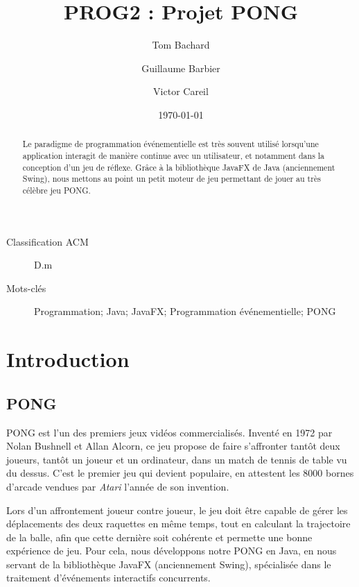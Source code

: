 \documentclass[a4paper,10pt]{article}
\theoremstyle{definition}
\begin{document}
%
\title{PROG2 : Projet PONG}
%
\author{Tom Bachard\and Guillaume Barbier\and Victor Careil}
%
\date{\today}
%
\maketitle
%
%

\begin{description}
  \item[Classification ACM] D.m
  \item[Mots-clés] Programmation; Java; JavaFX; Programmation événementielle; PONG
\end{description}

%
\begin{abstract}
Le paradigme de programmation événementielle est très souvent utilisé lorsqu'une application interagit de manière continue avec un utilisateur, et notamment dans la conception d'un jeu de réflexe. Grâce à la bibliothèque JavaFX de Java (anciennement Swing), nous mettons au point un petit moteur de jeu permettant de jouer au très célèbre jeu PONG.
\end{abstract}
%

%
\section{Introduction}
%

  \subsection{PONG}
	PONG est l'un des premiers jeux vidéos commercialisés. Inventé en 1972 par Nolan Bushnell et Allan Alcorn, ce jeu propose de faire s'affronter tantôt deux joueurs, tantôt un joueur et un ordinateur, dans un match de tennis de table vu du dessus. C'est le premier jeu qui devient populaire, en attestent les 8000 bornes d'arcade vendues par \emph{Atari} l'année de son invention.
	
	Lors d'un affrontement joueur contre joueur, le jeu doit être capable de gérer les déplacements des deux raquettes en même temps, tout en calculant la trajectoire de la balle, afin que cette dernière soit cohérente et permette une bonne expérience de jeu. Pour cela, nous développons notre PONG en Java, en nous servant de la bibliothèque JavaFX (anciennement Swing), spécialisée dans le traitement d'événements interactifs concurrents.
	
\end{document}
